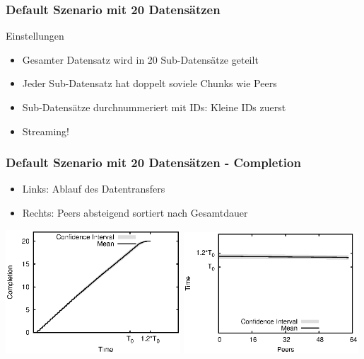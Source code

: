 \begin{frame}
  \frametitle{Default Szenario mit 20 Datensätzen}
  \begin{block}{Einstellungen}
	  \begin{itemize}  
	    \item Gesamter Datensatz wird in 20 Sub-Datensätze geteilt
	    \vspace{2mm}
	    \item Jeder Sub-Datensatz hat doppelt soviele Chunks wie Peers
	    \vspace{2mm}
	    \item Sub-Datensätze durchnummeriert mit IDs: Kleine IDs zuerst
	    \vspace{2mm}
	    \item Streaming!
	  \end{itemize}		
  \end{block}
\end{frame}

\begin{frame}
  \frametitle{Default Szenario mit 20 Datensätzen - Completion}
  \begin{itemize}  
    \item Links: Ablauf des Datentransfers
    \item Rechts: Peers absteigend sortiert nach Gesamtdauer
  \end{itemize}

  \begin{center}
    \includegraphics[width=0.49\textwidth]{fig/plots/scenario_6_parts_20/plots/GeneratedMeanChunkCompletion.csv.eps}
    \hfill
    \includegraphics[width=0.49\textwidth]{fig/plots/scenario_6_parts_20/plots/GeneratedMeanSortedChunkCompletion.csv.eps}
  \end{center}
\end{frame}


